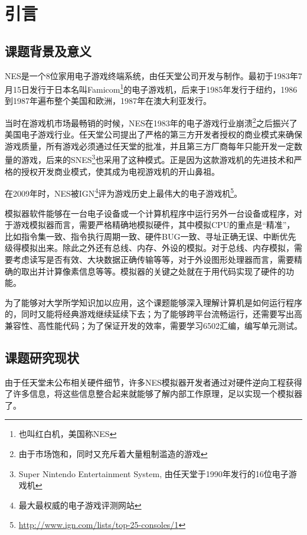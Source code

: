 \documentclass[a4paper]{ltxdoc}
\begin{document}
{
\setcounter{page}{1}
\pretocmd{\section}{\clearpage \vspace*{-2.0em}}{}{}

\setlength{\parindent}{2em}
\setlength{\parskip}{0.5em}
\setlength{\baselineskip}{22pt}

\section{引言}
\subsection{课题背景及意义}
NES是一个8位家用电子游戏终端系统，由任天堂公司开发与制作。最初于1983年7月15日发行于日本名叫Famicom\footnote{也叫红白机，美国称NES}的电子游戏机，后来于1985年发行于纽约，1986到1987年遍布整个美国和欧洲，1987年在澳大利亚发行。

当时在游戏机市场最畅销的时候，NES在1983年的电子游戏行业崩溃\footnote{由于市场饱和，同时又充斥着大量粗制滥造的游戏}之后振兴了美国电子游戏行业。任天堂公司提出了严格的第三方开发者授权的商业模式来确保游戏质量，所有游戏必须通过任天堂的批准，并且第三方厂商每年只能开发一定数量的游戏，后来的SNES\footnote{Super Nintendo Entertainment System, 由任天堂于1990年发行的16位电子游戏机}也采用了这种模式。正是因为这款游戏机的先进技术和严格的授权开发商业模式，使其成为电视游戏机的开山鼻祖。


在2009年时，NES被IGN\footnote{最大最权威的电子游戏评测网站}评为游戏历史上最伟大的电子游戏机\footnote{\url{http://www.ign.com/lists/top-25-consoles/1}}。

模拟器软件能够在一台电子设备或一个计算机程序中运行另外一台设备或程序，对于游戏模拟器而言，需要严格精确地模拟硬件，其中模拟CPU的重点是“精准”，比如指令集一致、指令执行周期一致、硬件BUG一致、寻址正确无误、中断优先级得模拟出来。除此之外还有总线、内存、外设的模拟。对于总线、内存模拟，需要考虑读写是否有效、大块数据正确传输等等，对于外设图形处理器而言，需要精确的取出并计算像素信息等等。模拟器的关键之处就在于用代码实现了硬件的功能。

为了能够对大学所学知识加以应用，这个课题能够深入理解计算机是如何运行程序的，同时又能将经典游戏继续延续下去；为了能够跨平台流畅运行，还需要写出高兼容性、高性能代码；为了保证开发的效率，需要学习6502汇编，编写单元测试。

\subsection{课题研究现状}
由于任天堂未公布相关硬件细节，许多NES模拟器开发者通过对硬件逆向工程获得了许多信息，将这些信息整合起来就能够了解内部工作原理，足以实现一个模拟器了。

}
\end{document}

